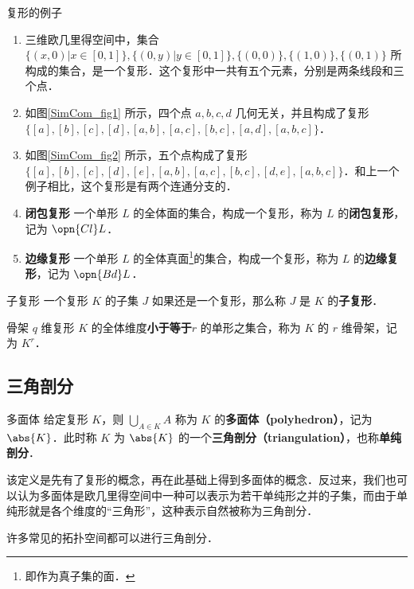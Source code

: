 \begin{example}{复形的例子}
\begin{enumerate}
\item 三维欧几里得空间中，集合 $\{(x, 0)|x\in[0,1]\}, \{(0, y)|y\in[0, 1]\}, \{(0, 0)\}, \{(1, 0)\}, \{(0, 1)\}$ 所构成的集合，是一个复形．这个复形中一共有五个元素，分别是两条线段和三个点．
\item 如图\autoref{SimCom_fig1} 所示，四个点 $a, b, c, d$ 几何无关，并且构成了复形 $\{[a], [b], [c], [d], [a, b], [a, c], [b, c], [a, d], [a, b, c]\}$．
\item 如图\autoref{SimCom_fig2} 所示，五个点构成了复形 $\{[a], [b], [c], [d], [e], [a, b], [a, c], [b, c], [d, e], [a, b, c]\}$．和上一个例子相比，这个复形是有两个连通分支的．
\item \textbf{闭包复形} 一个单形 $L$ 的全体面的集合，构成一个复形，称为 $L$ 的\textbf{闭包复形}，记为 $\opn{Cl} L$．
\item \textbf{边缘复形} 一个单形 $L$ 的全体真面\footnote{即作为真子集的面．}的集合，构成一个复形，称为 $L$ 的\textbf{边缘复形}，记为 $\opn{Bd} L$．
\end{enumerate}
\end{example}

\begin{definition}{子复形}
一个复形 $K$ 的子集 $J$ 如果还是一个复形，那么称 $J$ 是 $K$ 的\textbf{子复形}．
\end{definition}

\begin{definition}{骨架}
$q$ 维复形 $K$ 的全体维度\textbf{小于等于}$r$ 的单形之集合，称为 $K$ 的 $r$ 维骨架，记为 $K^r$．
\end{definition}

\subsection{三角剖分}

\begin{definition}{多面体}
给定复形 $K$，则 $\bigcup\limits_{A\in K}A$ 称为 $K$ 的\textbf{多面体（polyhedron）}，记为 $\abs{K}$．此时称 $K$ 为 $\abs{K}$ 的一个\textbf{三角剖分（triangulation）}，也称\textbf{单纯剖分}．
\end{definition}

该定义是先有了复形的概念，再在此基础上得到多面体的概念．反过来，我们也可以认为多面体是欧几里得空间中一种可以表示为若干单纯形之并的子集，而由于单纯形就是各个维度的“三角形”，这种表示自然被称为三角剖分．

许多常见的拓扑空间都可以进行三角剖分．

